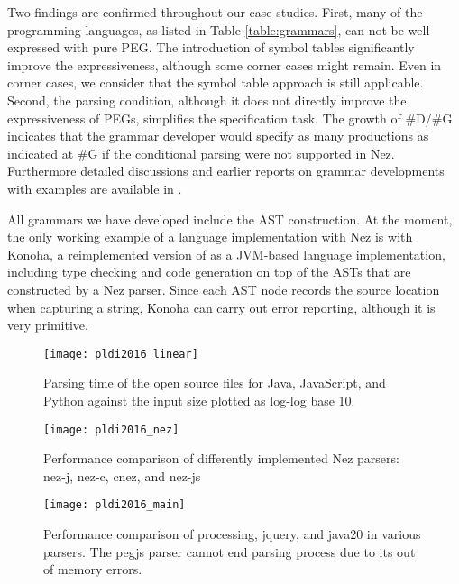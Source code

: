 \documentclass[preprint]{sigplanconf}
\begin{document}
Two findings are confirmed throughout our case studies.  First, many of the programming languages, as listed in Table \ref{table:grammars}, can not be well expressed with pure PEG. The introduction of symbol tables significantly improve the expressiveness, although some corner cases might remain. Even in corner cases, we consider that the symbol table approach is still applicable.  
Second, the parsing condition, although it does not directly improve the expressiveness of PEGs, simplifies the specification task. The growth of \#D/\#G indicates that the grammar developer would specify as many productions  as indicated at \#G if the conditional parsing were not supported in Nez. Furthermore detailed discussions and earlier reports on grammar developments with examples are available in \cite{JIPSE2015}. 

All grammars we have developed include the AST construction. 
At the moment, the only working example of a language implementation with Nez is with Konoha, a reimplemented version of \cite{Konoha} as a JVM-based language implementation, including type checking and code generation on top of the ASTs that are constructed by a Nez parser. 
Since each AST node records the source location when capturing a string, 
Konoha can carry out error reporting, although it is very primitive. 



\begin{figure*}[t]
\begin{center}
\texttt{[image: pldi2016\_linear]}
\caption{Parsing time of the open source files for Java, JavaScript, and Python against the input size plotted as log-log base 10. }
\label{fig:linear}
\end{center}
\end{figure*}

\begin{figure}[tb]
\begin{center}
\texttt{[image: pldi2016\_nez]}
\caption{Performance comparison of differently implemented Nez parsers: {\sf nez-j}, {\sf nez-c}, {\sf cnez}, and {\sf nez-js}}
\label{fig:nezperf}
\end{center}
\end{figure}

\begin{figure*}[tb]
\begin{center}
\texttt{[image: pldi2016\_main]}
\caption{Performance comparison of {\sf processing}, {\sf jquery}, and {\sf java20} in various parsers. The {\sf pegjs} parser cannot end parsing {\sf process} due to its out of memory errors. }
\label{fig:mainperf}
\end{center}
\end{figure*}
\end{document}

